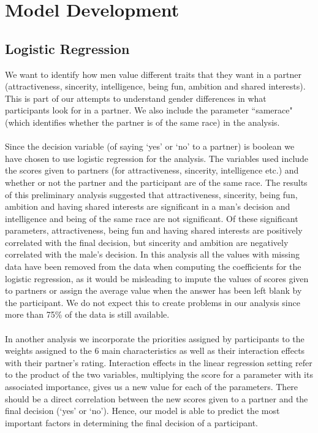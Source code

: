 \documentclass{article}
\begin{document}
\section{Model Development}
\subsection{Logistic Regression}
We want to identify how men value different traits that they want in a partner (attractiveness, sincerity, intelligence, being fun, ambition and shared interests). This is part of our attempts to understand gender differences in what participants look for in a partner. We also include the parameter ``samerace" (which identifies whether the partner is of the same race) in the analysis.\\
\null\\
Since the decision variable (of saying `yes' or `no' to a partner) is boolean we have chosen to use logistic regression for the analysis. The variables used include the scores given to partners (for attractiveness, sincerity, intelligence etc.) and whether or not the partner and the participant are of the same race. The results of this preliminary analysis suggested that attractiveness, sincerity, being fun, ambition and having shared interests are significant in a man's decision and intelligence and being of the same race are not significant. Of these significant parameters, attractiveness, being fun and having shared interests are positively correlated with the final decision, but sincerity and ambition are negatively correlated with the male's decision. In this analysis all the values with missing data have been removed from the data when computing the coefficients for the logistic regression, as it would be misleading to impute the values of scores given to partners or assign the average value when the answer has been left blank by the participant. We do not expect this to create problems in our analysis since more than 75\% of the data is still available. \\
\null\\
In another analysis we incorporate the priorities assigned by participants to the weights assigned to the 6 main characteristics as well as their interaction effects with their partner's rating.  Interaction effects in the linear regression setting refer to the product of the two variables, multiplying the score for a parameter with its associated importance, gives us a new value for each of the parameters. There should be a direct correlation between the new scores given to a partner and the final decision (`yes' or `no').  Hence, our model is able to predict the most important factors in determining the final decision of a participant. 
\end{document}
